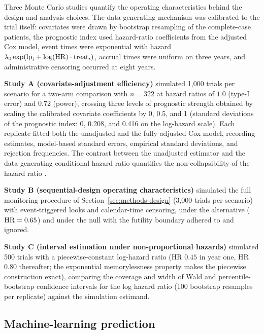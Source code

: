Three Monte Carlo studies quantify the operating characteristics behind
the design and analysis choices. The data-generating mechanism was
calibrated to the trial itself: covariates were drawn by bootstrap
resampling of the complete-case patients, the prognostic index used
hazard-ratio coefficients from the adjusted Cox model, event times were
exponential with hazard $\lambda_0 \exp(\mathrm{lp}_i + \log(\mathrm{HR})
\cdot \mathrm{treat}_i)$, accrual times were uniform on three years, and
administrative censoring occurred at eight years.

\textbf{Study A (covariate-adjustment efficiency)} simulated 1{,}000
trials per scenario for a two-arm comparison with $n=322$ at hazard
ratios of $1.0$ (type-I error) and $0.72$ (power), crossing three levels
of prognostic strength obtained by scaling the calibrated covariate
coefficients by 0, 0.5, and 1 (standard deviations of the prognostic
index: 0, 0.208, and 0.416 on the log-hazard scale). Each replicate
fitted both the unadjusted and the fully adjusted Cox model, recording
estimates, model-based standard errors, empirical standard deviations,
and rejection frequencies. The contrast between the unadjusted estimator
and the data-generating conditional hazard ratio quantifies the
non-collapsibility of the hazard ratio \citep{martinussen2013}.

\textbf{Study B (sequential-design operating characteristics)}
simulated the full monitoring procedure of
Section~\ref{sec:methods-design} (3{,}000 trials per scenario) with
event-triggered looks and calendar-time censoring, under the alternative
($\mathrm{HR}=0.65$) and under the null with the futility boundary adhered to
and ignored.

\textbf{Study C (interval estimation under non-proportional hazards)}
simulated 500 trials with a piecewise-constant log-hazard ratio (HR
$0.45$ in year one, HR $0.80$ thereafter; the exponential
memorylessness property makes the piecewise construction exact),
comparing the coverage and width of Wald and percentile-bootstrap
confidence intervals for the log hazard ratio (100 bootstrap resamples
per replicate) against the simulation estimand.

\subsection{Machine-learning prediction}\label{sec:methods-ml}

